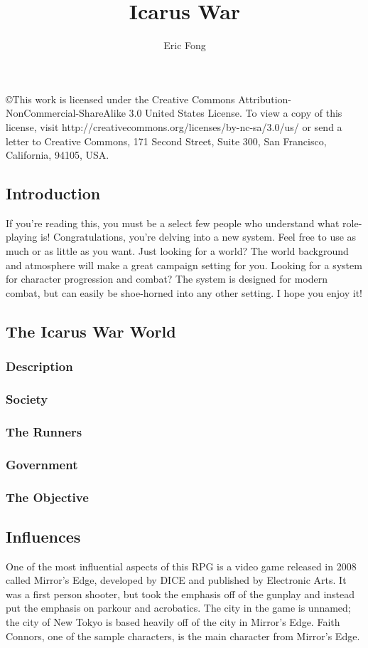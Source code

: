 \documentclass{article}
\title{\bfseries Icarus War}
\author {Eric Fong}
\begin{document}
\maketitle
\copyright{This work is licensed under the Creative Commons
Attribution-NonCommercial-ShareAlike 3.0 United States License. To view a copy
of this license, visit http://creativecommons.org/licenses/by-nc-sa/3.0/us/ or
send a letter to Creative Commons, 171 Second Street, Suite 300, San Francisco,
California, 94105, USA.}
\thispagestyle{empty}
\clearpage
\begin{multicols}{2}
\tableofcontents
\thispagestyle{empty}
\clearpage
\pagestyle{fancy}

\setcounter{page}{1}
\section{Introduction}
If you’re reading this, you must be a select few people who understand what
role-playing is! Congratulations, you’re delving into a new system. Feel free
to use as much or as little as you want. Just looking for a world? The world
background and atmosphere will make a great campaign setting for you. Looking
for a system for character progression and combat? The system is designed for
modern combat, but can easily be shoe-horned into any other setting. I hope you
enjoy it!
\subsection{The Icarus War World}
\subsubsection{Description}
\subsubsection{Society}
\subsubsection{The Runners}
\subsubsection{Government}
\subsubsection{The Objective}
\subsection{Influences}
One of the most influential aspects of this RPG is a video game released in
2008 called Mirror’s Edge, developed by DICE and published by Electronic Arts.
It was a first person shooter, but took the emphasis off of the gunplay and
instead put the emphasis on parkour and acrobatics. The city in the game is
unnamed; the city of New Tokyo is based heavily off of the city in Mirror’s
Edge. Faith Connors, one of the sample characters, is the main character from
Mirror’s Edge.


\end{multicols}
\end{document}
